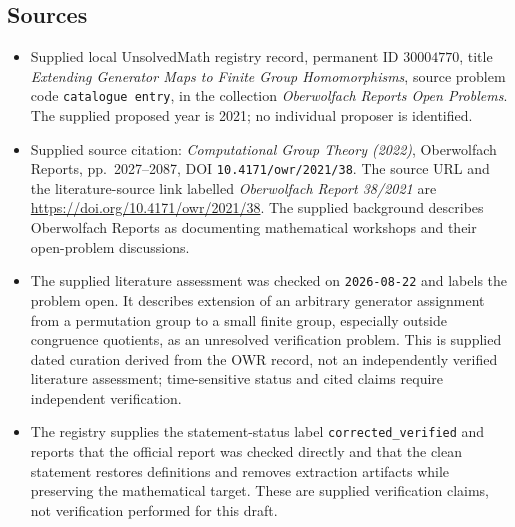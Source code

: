 \documentclass[11pt]{article}
\begin{document}
\subsection{Sources}
\begin{itemize}
\item Supplied local UnsolvedMath registry record, permanent ID \(30004770\), title \emph{Extending Generator Maps to Finite Group Homomorphisms}, source problem code \texttt{catalogue entry}, in the collection \emph{Oberwolfach Reports Open Problems}. The supplied proposed year is 2021; no individual proposer is identified.
\item Supplied source citation: \emph{Computational Group Theory (2022)}, Oberwolfach Reports, pp.~2027--2087, DOI \texttt{10.4171/owr/2021/38}. The source URL and the literature-source link labelled \emph{Oberwolfach Report 38/2021} are \url{https://doi.org/10.4171/owr/2021/38}. The supplied background describes Oberwolfach Reports as documenting mathematical workshops and their open-problem discussions.
\item The supplied literature assessment was checked on \texttt{2026-08-22} and labels the problem open. It describes extension of an arbitrary generator assignment from a permutation group to a small finite group, especially outside congruence quotients, as an unresolved verification problem. This is supplied dated curation derived from the OWR record, not an independently verified literature assessment; time-sensitive status and cited claims require independent verification.
\item The registry supplies the statement-status label \texttt{corrected\_verified} and reports that the official report was checked directly and that the clean statement restores definitions and removes extraction artifacts while preserving the mathematical target. These are supplied verification claims, not verification performed for this draft.
\end{itemize}
\end{document}
